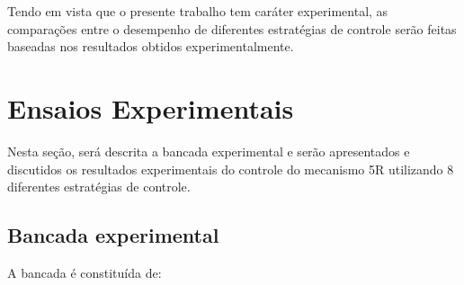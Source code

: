 \documentclass[]{politex}
\begin{document}
Tendo em vista que o presente trabalho tem caráter experimental, as comparações entre o desempenho de diferentes estratégias de controle serão feitas baseadas nos resultados obtidos experimentalmente.

\section{Ensaios Experimentais}

Nesta seção, será descrita a bancada experimental e serão apresentados e discutidos os resultados experimentais do controle do mecanismo 5R utilizando 8 diferentes estratégias de controle.

\subsection{Bancada experimental}

A bancada é constituída de:
\end{document}
